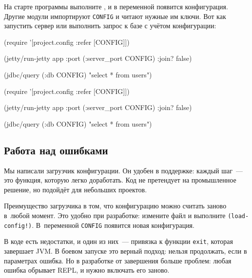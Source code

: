 \fi

На старте программы выполните , и в переменной появится
конфигурация. Другие модули импортируют \verb|CONFIG| и читают нужные им
ключи. Вот как запустить сервер или выполнить запрос к базе с учётом
конфигурации:


\ifnarrow

\begin{english}
  \begin{clojure}
(require
  '[project.config :refer [CONFIG]])

(jetty/run-jetty app
  {:port (:server_port CONFIG)
   :join? false})

(jdbc/query (:db CONFIG)
  "select * from users")
  \end{clojure}
\end{english}

\else

\begin{english}
  \begin{clojure}
(require '[project.config :refer [CONFIG]])

(jetty/run-jetty app {:port (:server_port CONFIG)
                      :join? false})

(jdbc/query (:db CONFIG) "select * from users")
  \end{clojure}
\end{english}

\fi

\subsection{Работа над ошибками}

Мы написали загрузчик конфигурации. Он удобен в поддержке: каждый шаг~--- это
функция, которую легко доработать. Код не претендует на промышленное решение, но
подойдёт для небольших проектов.

Преимущество загрузчика в том, что конфигурацию можно считать заново в~любой
момент. Это удобно при разработке: измените файл и выполните
\verb|(load-config!)|. В~переменной \verb|CONFIG| появится новая конфигурация.


В коде есть недостатки, и один из них~--- привязка к функции \verb|exit|,
которая завершает JVM. В боевом запуске это верный подход: нельзя продолжать,
если в параметрах ошибка. Но в разработке от завершения больше проблем: любая
ошибка обрывает REPL, и нужно включать его заново.

